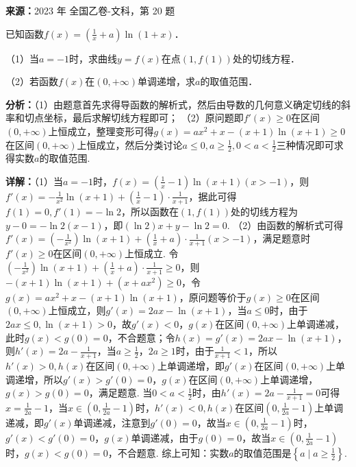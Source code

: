 \begin{question}[points=12]
\textbf{来源：}2023 年 全国乙卷-文科，第 20 题\par
已知函数$f(x)=\left(\frac{1}{x}+a\right)\ln(1+x)$．

（1）当$a=-1$时，求曲线$y=f(x)$在点$(1,f(1))$处的切线方程．

（2）若函数$f(x)$在$(0,+\infty)$单调递增，求$a$的取值范围．
\begin{solution}

\textbf{分析：}（1）由题意首先求得导函数的解析式，然后由导数的几何意义确定切线的斜率和切点坐标，最后求解切线方程即可；
（2）原问题即$f'(x)\ge0$在区间$(0,+\infty)$上恒成立，整理变形可得$g(x)=ax^2+x-(x+1)\ln(x+1)\ge0$在区间$(0,+\infty)$上恒成立，然后分类讨论$a\le0, a\ge\frac{1}{2}, 0<a<\frac{1}{2}$三种情况即可求得实数$a$的取值范围.

\textbf{详解：}（1）当$a=-1$时，$f(x)=\left(\frac{1}{x}-1\right)\ln(x+1)(x>-1)$，则$f'(x)=-\frac{1}{x^2}\ln(x+1)+\left(\frac{1}{x}-1\right)\cdot\frac{1}{x+1}$，据此可得$f(1)=0, f'(1)=-\ln2$，所以函数在$(1,f(1))$处的切线方程为$y-0=-\ln2(x-1)$，即$(\ln2)x+y-\ln2=0$.
（2）由函数的解析式可得$f'(x)=\left(-\frac{1}{x^2}\right)\ln(x+1)+\left(\frac{1}{x}+a\right)\cdot\frac{1}{x+1}(x>-1)$，满足题意时$f'(x)\ge0$在区间$(0,+\infty)$上恒成立. 令$\left(-\frac{1}{x^2}\right)\ln(x+1)+\left(\frac{1}{x}+a\right)\cdot\frac{1}{x+1}\ge0$，则$-(x+1)\ln(x+1)+(x+ax^2)\ge0$，令$g(x)=ax^2+x-(x+1)\ln(x+1)$，原问题等价于$g(x)\ge0$在区间$(0,+\infty)$上恒成立，则$g'(x)=2ax-\ln(x+1)$，当$a\le0$时，由于$2ax\le0, \ln(x+1)>0$，故$g'(x)<0$，$g(x)$在区间$(0,+\infty)$上单调递减，此时$g(x)<g(0)=0$，不合题意；令$h(x)=g'(x)=2ax-\ln(x+1)$，则$h'(x)=2a-\frac{1}{x+1}$，当$a\ge\frac{1}{2}$，$2a\ge1$时，由于$\frac{1}{x+1}<1$，所以$h'(x)>0, h(x)$在区间$(0,+\infty)$上单调递增，即$g'(x)$在区间$(0,+\infty)$上单调递增，所以$g'(x)>g'(0)=0$，$g(x)$在区间$(0,+\infty)$上单调递增，$g(x)>g(0)=0$，满足题意. 当$0<a<\frac{1}{2}$时，由$h'(x)=2a-\frac{1}{x+1}=0$可得$x=\frac{1}{2a}-1$，当$x\in(0,\frac{1}{2a}-1)$时，$h'(x)<0, h(x)$在区间$(0,\frac{1}{2a}-1)$上单调递减，即$g'(x)$单调递减，注意到$g'(0)=0$，故当$x\in(0,\frac{1}{2a}-1)$时，$g'(x)<g'(0)=0$，$g(x)$单调递减，由于$g(0)=0$，故当$x\in(0,\frac{1}{2a}-1)$时，$g(x)<g(0)=0$，不合题意. 综上可知：实数$a$的取值范围是$\left\{a\mid a\ge\frac{1}{2}\right\}$.
\end{solution}
\end{question}

